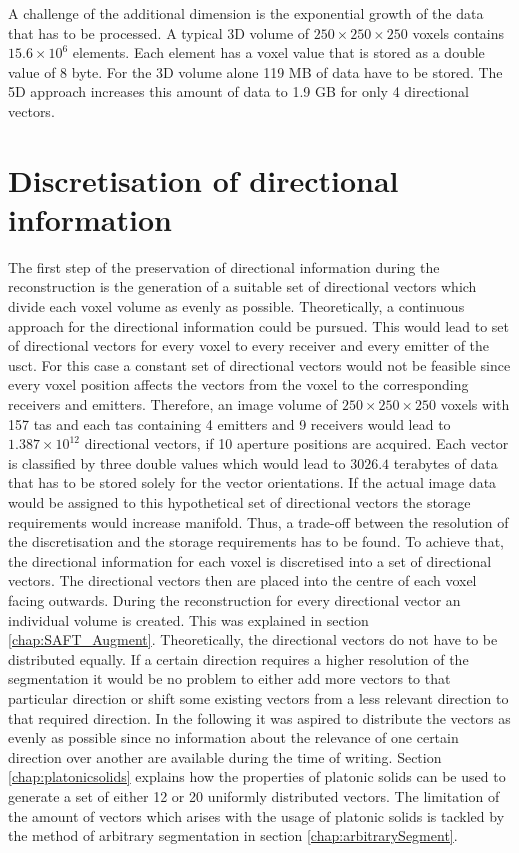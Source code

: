 A challenge of the additional dimension is the exponential growth of the data that has to be processed. A typical 3D volume of $250\times250\times250$ voxels contains $15.6\times10^6$ elements. Each element has a voxel value that is stored as a double value of 8 byte. For the 3D volume alone 119 MB of data have to be stored. The 5D approach increases this amount of data to 1.9 GB for only 4 directional vectors.   



\section{Discretisation of directional information}
\label{chap:segmentation}


The first step of the preservation of directional information during the reconstruction is the generation of a suitable set of directional vectors which divide each voxel volume as evenly as possible.
Theoretically, a continuous approach for the directional information could be pursued. This would lead to set of directional vectors for every voxel to every receiver and every emitter of the \ac{usct}. For this case a constant set of directional vectors would not be feasible since every voxel position affects the vectors from the voxel to the corresponding receivers and emitters. Therefore, an image volume of $250 \times 250 \times 250$ voxels with 157 \ac{tas} and each \ac{tas} containing 4 emitters and 9 receivers would lead to $1.387\times 10^{12}$ directional vectors, if 10 aperture positions are acquired. Each vector is classified by three double values which would lead to $3026.4$ terabytes of data that has to be stored solely for the vector orientations. If the actual image data would be assigned to this hypothetical set of directional vectors the storage requirements would increase manifold. Thus, a trade-off between the resolution of the discretisation and the storage requirements has to be found. To achieve that, the directional information for each voxel is discretised into a set of directional vectors. The directional vectors then are placed into the centre of each voxel facing outwards. During the reconstruction for every directional vector an individual volume is created. This was explained in section \ref{chap:SAFT_Augment}. Theoretically, the directional vectors do not have to be distributed equally. If a certain direction requires a higher resolution of the segmentation it would be no problem to either add more vectors to that particular direction or shift some existing vectors from a less relevant direction to that required direction. In the following it was aspired to distribute the vectors as evenly as possible since no information about the relevance of one certain direction over another are available during the time of writing.
Section \ref{chap:platonicsolids} explains how the properties of platonic solids can be used to generate a set of either 12 or 20 uniformly distributed vectors. The limitation of the amount of vectors which arises with the usage of platonic solids is tackled by the method of arbitrary segmentation in section \ref{chap:arbitrarySegment}.







